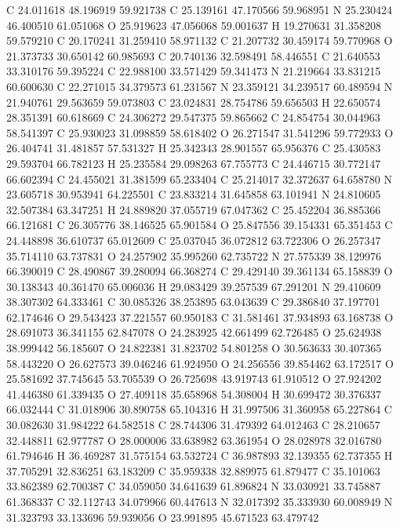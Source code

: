\documentclass{article}
\begin{document}
C 24.011618 48.196919 59.921738 
C 25.139161 47.170566 59.968951 
N 25.230424 46.400510 61.051068 
O 25.919623 47.056068 59.001637 
H 19.270631 31.358208 59.579210 
C 20.170241 31.259410 58.971132 
C 21.207732 30.459174 59.770968 
O 21.373733 30.650142 60.985693 
C 20.740136 32.598491 58.446551 
C 21.640553 33.310176 59.395224 
C 22.988100 33.571429 59.341473 
N 21.219664 33.831215 60.600630 
C 22.271015 34.379573 61.231567 
N 23.359121 34.239517 60.489594 
N 21.940761 29.563659 59.073803 
C 23.024831 28.754786 59.656503 
H 22.650574 28.351391 60.618669 
C 24.306272 29.547375 59.865662 
C 24.854754 30.044963 58.541397 
C 25.930023 31.098859 58.618402 
O 26.271547 31.541296 59.772933 
O 26.404741 31.481857 57.531327 
H 25.342343 28.901557 65.956376 
C 25.430583 29.593704 66.782123 
H 25.235584 29.098263 67.755773 
C 24.446715 30.772147 66.602394 
C 24.455021 31.381599 65.233404 
C 25.214017 32.372637 64.658780 
N 23.605718 30.953941 64.225501 
C 23.833214 31.645858 63.101941 
N 24.810605 32.507384 63.347251 
H 24.889820 37.055719 67.047362 
C 25.452204 36.885366 66.121681 
C 26.305776 38.146525 65.901584 
O 25.847556 39.154331 65.351453 
C 24.448898 36.610737 65.012609 
C 25.037045 36.072812 63.722306 
O 26.257347 35.714110 63.737831 
O 24.257902 35.995260 62.735722 
N 27.575339 38.129976 66.390019 
C 28.490867 39.280094 66.368274 
C 29.429140 39.361134 65.158839 
O 30.138343 40.361470 65.006036 
H 29.083429 39.257539 67.291201 
N 29.410609 38.307302 64.333461 
C 30.085326 38.253895 63.043639 
C 29.386840 37.197701 62.174646 
O 29.543423 37.221557 60.950183 
C 31.581461 37.934893 63.168738 
O 28.691073 36.341155 62.847078 
O 24.283925 42.661499 62.726485 
O 25.624938 38.999442 56.185607 
O 24.822381 31.823702 54.801258 
O 30.563633 30.407365 58.443220 
O 26.627573 39.046246 61.924950 
O 24.256556 39.854462 63.172517 
O 25.581692 37.745645 53.705539 
O 26.725698 43.919743 61.910512 
O 27.924202 41.446380 61.339435 
O 27.409118 35.658968 54.308004 
H 30.699472 30.376337 66.032444 
C 31.018906 30.890758 65.104316 
H 31.997506 31.360958 65.227864 
C 30.082630 31.984222 64.582518 
C 28.744306 31.479392 64.012463 
C 28.210657 32.448811 62.977787 
O 28.000006 33.638982 63.361954 
O 28.028978 32.016780 61.794646 
H 36.469287 31.575154 63.532724 
C 36.987893 32.139355 62.737355 
H 37.705291 32.836251 63.183209 
C 35.959338 32.889975 61.879477 
C 35.101063 33.862389 62.700387 
C 34.059050 34.641639 61.896824 
N 33.030921 33.745887 61.368337 
C 32.112743 34.079966 60.447613 
N 32.017392 35.333930 60.008949 
N 31.323793 33.133696 59.939056 
O 23.991895 45.671523 63.479742 
\end{document}
